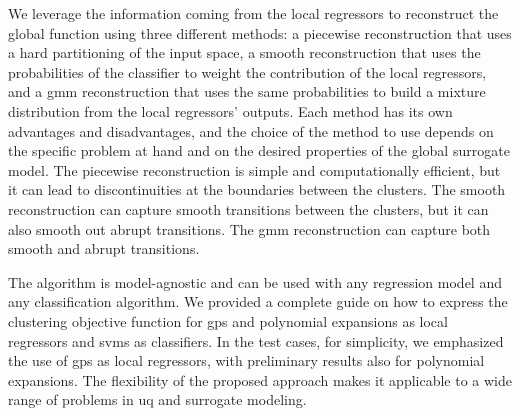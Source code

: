 \smallskip
We leverage the information coming from the local regressors to reconstruct the global function using three different methods: a piecewise reconstruction that uses a hard partitioning of the input space, a smooth reconstruction that uses the probabilities of the classifier to weight the contribution of the local regressors, and a \gls{gmm} reconstruction that uses the same probabilities to build a mixture distribution from the local regressors' outputs. Each method has its own advantages and disadvantages, and the choice of the method to use depends on the specific problem at hand and on the desired properties of the global surrogate model. The piecewise reconstruction is simple and computationally efficient, but it can lead to discontinuities at the boundaries between the clusters. The smooth reconstruction can capture smooth transitions between the clusters, but it can also smooth out abrupt transitions. The \gls{gmm} reconstruction can capture both smooth and abrupt transitions.

\smallskip
The algorithm is model-agnostic and can be used with any regression model and any classification algorithm. We provided a complete guide on how to express the clustering objective function for \glspl{gp} and polynomial expansions as local regressors and \glspl{svm} as classifiers. In the test cases, for simplicity, we emphasized the use of \glspl{gp} as local regressors, with preliminary results also for polynomial expansions. The flexibility of the proposed approach makes it applicable to a wide range of problems in \gls{uq} and surrogate modeling.


